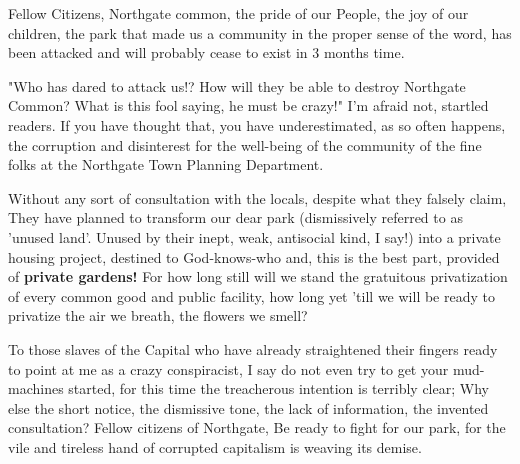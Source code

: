 \documentclass{article}
\date{\today}
\begin{document}
\maketitle
\begin{multicols}{3}
Fellow Citizens, Northgate common, the pride of our People, the joy of our
children, the park that made us a community in the proper sense of the word, has
been attacked and will probably cease to exist in 3 months time.

"Who has dared to attack us!?  How will they be able to destroy Northgate Common? What is this fool saying, he must be crazy!"
I'm afraid not, startled readers. If you have thought that, you have underestimated, as so often happens, the corruption
and disinterest for the well-being of the community of the fine folks at the Northgate Town Planning Department.

Without any sort of consultation with the locals, despite what they falsely claim, They have planned to transform our dear park
(dismissively referred to as 'unused land'. Unused by their inept, weak, antisocial kind, I say!) into a private housing project, 
destined to God-knows-who and, this is the best part, provided of \textbf{private gardens!}
For how long still will we stand the gratuitous privatization of every common good and public facility, how long yet 'till we will be ready to privatize
the air we breath, the flowers we smell?

To those slaves of the Capital who have already straightened their fingers ready to point at me as a crazy conspiracist, 
I say do not even try to get your mud-machines started, for this time the treacherous intention is terribly clear;
Why else the short notice, the dismissive tone, the lack of information, the invented consultation?
Fellow citizens of Northgate,
Be ready to fight for our park, for the vile and tireless hand of corrupted capitalism is weaving its demise.
\closearticle
\end{multicols}
\end{document}
